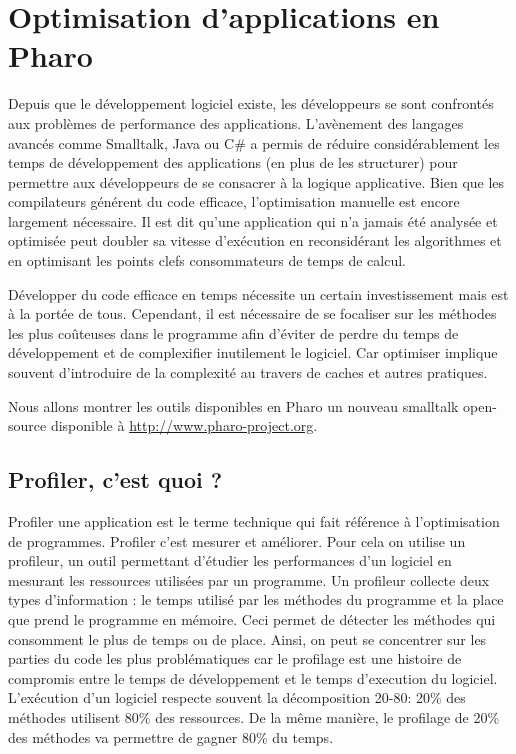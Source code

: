 \documentclass[a4paper,10pt,twoside]{book}
\begin{document}


\chapter{Optimisation d'applications en Pharo}

Depuis que le d\'eveloppement logiciel existe, les d\'eveloppeurs se sont confront\'es aux probl\`emes de performance des applications. L'av\`enement des langages avanc\'es comme Smalltalk, Java ou C\# a permis de r\'eduire consid\'erablement les temps de d\'eveloppement des applications (en plus de les structurer) pour permettre aux d\'eveloppeurs de se consacrer \`a la logique applicative. Bien que les compilateurs g\'en\'erent du code efficace, l'optimisation manuelle est encore largement n\'ecessaire. Il est dit qu'une application qui n'a jamais \'et\'e analys\'ee et optimis\'ee peut doubler sa vitesse d'ex\'ecution en reconsid\'erant les algorithmes et en optimisant les points clefs consommateurs de temps de calcul. 

D\'evelopper du code efficace en temps n\'ecessite un certain investissement mais est \`a la port\'ee de tous.  Cependant, il est n\'ecessaire de se focaliser sur les m\'ethodes les plus co\^uteuses dans le programme afin d'\'eviter de perdre du temps de d\'eveloppement et de complexifier inutilement le logiciel. Car optimiser implique souvent d'introduire de la complexit\'e au travers de caches et autres pratiques. 

Nous allons montrer les outils disponibles en Pharo un nouveau smalltalk open-source disponible \`a \url{http://www.pharo-project.org}. 


\section{Profiler, c'est quoi ?} 
Profiler une application est le terme technique qui fait r\'ef\'erence \`a l'optimisation de programmes. 
Profiler c'est mesurer et am\'eliorer. Pour cela on utilise un profileur, un outil permettant d'\'etudier les performances d'un logiciel en mesurant les ressources utilis\'ees par un programme. Un profileur collecte deux types d'information : le temps utilis\'e par les m\'ethodes du programme et la place que prend le programme en m\'emoire.  Ceci permet de d\'etecter les m\'ethodes qui consomment le plus de temps ou de place. Ainsi, on peut se concentrer sur les parties du code les plus probl\'ematiques car le profilage est une histoire de compromis entre le temps de d\'eveloppement et le temps d'execution du logiciel. L'ex\'ecution d'un logiciel respecte souvent la d\'ecomposition  20-80: 20\% des m\'ethodes utilisent 80\% des ressources. De la m\^eme mani\`ere, le profilage de 20\% des m\'ethodes va permettre de gagner 80\% du temps.
\end{document}
